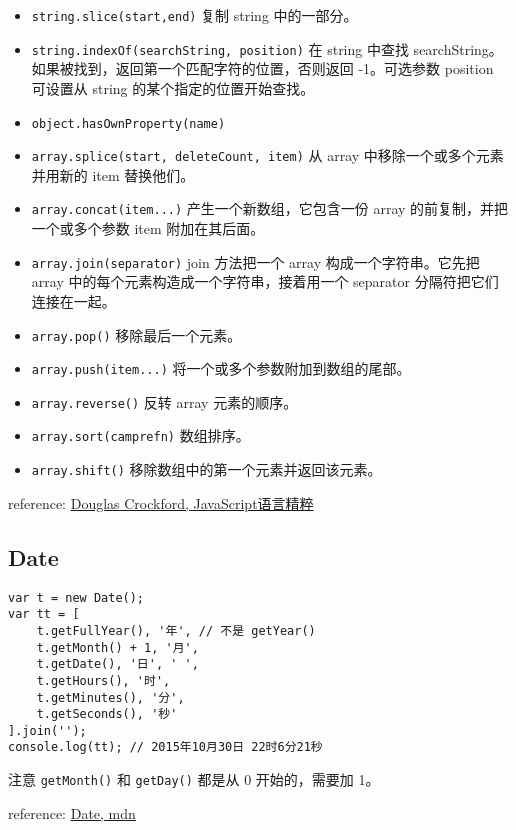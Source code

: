 \begin{itemize}
\item \texttt{string.slice(start,end)} 复制 string 中的一部分。
\item \texttt{string.indexOf(searchString, position)} 在 string 中查找 searchString。如果被找到，返回第一个匹配字符的位置，否则返回 -1。可选参数 position 可设置从 string 的某个指定的位置开始查找。
\item \texttt{object.hasOwnProperty(name)}
\item \texttt{array.splice(start, deleteCount, item)} 从 array 中移除一个或多个元素并用新的 item 替换他们。
\item \texttt{array.concat(item...)} 产生一个新数组，它包含一份 array 的前复制，并把一个或多个参数 item 附加在其后面。
\item \texttt{array.join(separator)} join 方法把一个 array 构成一个字符串。它先把 array 中的每个元素构造成一个字符串，接着用一个 separator 分隔符把它们连接在一起。
\item \texttt{array.pop()} 移除最后一个元素。
\item \texttt{array.push(item...)} 将一个或多个参数附加到数组的尾部。
\item \texttt{array.reverse()} 反转 array 元素的顺序。
\item \texttt{array.sort(camprefn)} 数组排序。
\item \texttt{array.shift()} 移除数组中的第一个元素并返回该元素。
\end{itemize}

reference: \href{http://book.douban.com/subject/11874748/}{Douglas Crockford, JavaScript语言精粹}

\subsection{Date}\hypertarget{date}{}\label{date}

\begin{verbatim}var t = new Date();
var tt = [
    t.getFullYear(), '年', // 不是 getYear()
    t.getMonth() + 1, '月',
    t.getDate(), '日', ' ',
    t.getHours(), '时',
    t.getMinutes(), '分',
    t.getSeconds(), '秒'
].join('');
console.log(tt); // 2015年10月30日 22时6分21秒
\end{verbatim}

注意 \texttt{getMonth()} 和 \texttt{getDay()} 都是从 0 开始的，需要加 1。

reference: \href{https://developer.mozilla.org/en-US/docs/Web/JavaScript/Reference/Global\_Objects/Date}{Date, mdn}

